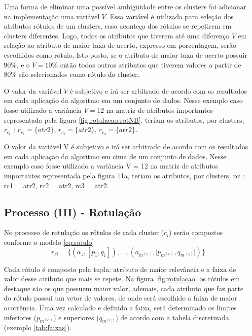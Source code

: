 Uma forma de eliminar uma possível ambiguidade entre os clusters foi adicionar na implementação uma variável  ${V}$. Essa variável é utilizada para seleção dos atributos rótulos de um clusters, caso aconteça dos rótulos se repetirem em clusters diferentes. Logo, todos os atributos que tiverem até uma diferença ${V}$ em relação ao atributo de maior taxa de acerto, expresso em porcentagem, serão escolhidos como rótulo. Isto posto, se o atributo de maior taxa de acerto possuir ${90\%}$, e o ${V=10\%}$  então todos outros atributos que tiverem valores a partir de ${80\%}$ são selecionados como rótulo do cluster.  

O valor da variável ${V}$ é subjetivo e irá ser arbitrado de acordo com os resultados em cada aplicação do algoritmo em um conjunto de dados. Nesse exemplo caso fosse utilizado a variância ${V=12}$ na matriz de atributos importantes representada pela figura \ref{fig:rotulacao:rotNB}, teriam os atributos, por clusters, ${r_{c_i}}$ : ${r_{c_1}=\{atr2\}}$, ${r_{c_2}=\{atr2\}}$, ${r_{c_3}=\{atr2\}}$.

O valor da variável V é subjetivo e irá ser arbitrado de acordo com os resultados
em cada aplicação do algoritmo em cima de um conjunto de dados. Nesse exemplo caso
fosse utilizado a variância V = 12 na matriz de atributos importantes representada pela
figura 11a, teriam os atributos, por clusters, rci : rc1 = {atr2}, rc2 = {atr2}, rc3 = {atr2}.


\subsection{Processo (III) - Rotulação} \label{cap:ferramentas:ssec:rotulacao}

No processo de rotulação os rótulos de cada cluster (${c_i}$) serão compostos conforme o  modelo \ref{eq:rotulo}. 
\begin{equation}\label{eq:rotulo}
r_{ci}=\{ (a_1,[p_1,q_1]),...,(a_{m^{(c_i)}}, ]p_{m^{(c_i)}},q_{m^{(c_i)}}]) \} 
\end{equation}

 Cada rótulo é composto pela tupla:  atributo de maior relevância e a faixa de valor desse atributo que mais se repete. Na figura \ref{fig:rotulacao} os rótulos em destaque são os que possuem maior valor, ademais, cada atributo que faz parte do rótulo possui um vetor de valores, de onde será escolhido a faixa de maior ocorrência. Uma vez calculado e definido a faixa, será determinado os limites inferiores (${p_{m^{(c_i)}}}$) e superiores (${q_{m^{(c_i)}}}$) de acordo com a tabela discretizada (exemplo \ref{tab:faixas}). 


